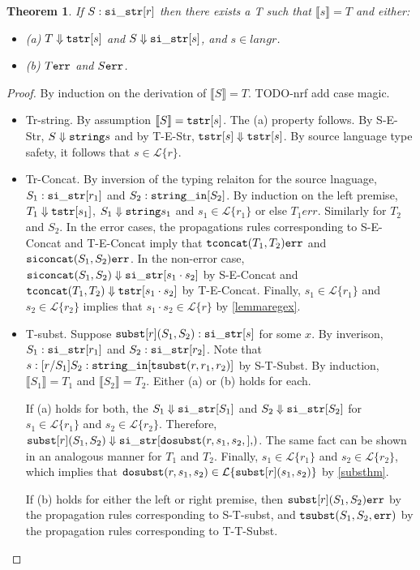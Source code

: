 \documentclass[10pt,preprint]{sigplanconf}
\newtheorem{thm}{Theorem}
\theoremstyle{definition}
\newcommand{\Lagr}{\mathcal{L}}
\newcommand{\lang}[1]{\Lagr\{#1\}}
\newcommand{\sisubst}[3]{{\tt subst}[#1](#2,#3)}
\newcommand{\sistr}[1]{{\tt si\_str}[#1]}
\newcommand{\strin}[1]{\sistr{#1}}
\newcommand{\siconcat}[2]{{\tt siconcat}(#1,#2)}
\newcommand{\stringin}[1]{{\tt string\_in}[#1]}
\newcommand{\tsubst}[3]{{\tt tsubst}(#1,#2,#3)}
\renewcommand{\tstr}[1]{{{\tt tstr}[#1]}}
\newcommand{\tconcat}[2]{{\tt tconcat}(#1,#2)}
\newcommand{\str}{{\tt string}}
\newcommand{\dosubst}[3]{{\tt dosubst}(#1,#2,#3)}
\newcommand{\err}{{\tt err}}
\newcommand{\trden}[1]{\llbracket #1 \rrbracket} %
\newcommand{\treduces}{ \Downarrow }
\newcommand{\sreduces}{ \Downarrow }
\begin{document}
\begin{thm}
If $S : \strin{r}$ then there exists a T such that $\trden{s} = T$ and either: 
\begin{itemize}
\item (a) $T \treduces \tstr{s}$ and $S \sreduces \strin{s}$, and $s \in lang{r}$.
\item (b) $T \err$ and $S \err$.
\end{itemize}
\end{thm}
\begin{proof}
By induction on the derivation of $\trden{S} = T$. TODO-nrf add case magic.
\begin{itemize}
\item Tr-string. By assumption $\trden{S} = \tstr{s}$. The (a) property follows.
By S-E-Str, $S \sreduces \str{s}$ and by T-E-Str, $\tstr{s} \treduces \tstr{s}$.
By source language type safety, it follows that $s \in \lang{r}$.
\item Tr-Concat.
By inversion of the typing relaiton for the source lnaguage, $S_1 : \strin{r_1}$ and $S_2 : \stringin{S_2}$.
By induction on the left premise, $T_1 \treduces \tstr{s_1}$, $S_1 \sreduces \str{s_1}$ and $s_1 \in \lang{r_1}$
or else $T_1 err$. 
Similarly for $T_2$ and $S_2$.
In the error cases, the propagations rules corresponding to S-E-Concat and T-E-Concat imply that $\tconcat{T_1}{T_2} \err$ and $\siconcat{S_1}{S_2} \err$.
In the non-error case, $\siconcat{S_1}{S_2} \sreduces \strin{s_1 \cdot s_2}$ by S-E-Concat and $\tconcat{T_1}{T_2} \treduces \tstr{s_1 \cdot s_2}$ by T-E-Concat.
Finally, $s_1 \in \lang{r_1}$ and $s_2 \in \lang{r_2}$ implies that $s_1 \cdot s_2 \in \lang{r}$ by \ref{lemmaregex}.
\item T-subst.
Suppose $\sisubst{r}{S_1}{S_2} : \strin{s}$ for some $x$. 
By inverison, $S_1 : \strin{r_1}$ and $S_2 : \strin{r_2}$.
Note that $s : \subst{r}{S_1}{S_2} : \stringin{\tsubst{r}{r_1}{r_2}}$ by S-T-Subst.
By induction, $\trden{S_1} = T_1$ and $\trden{S_2} = T_2$.
Either (a) or (b) holds for each.

If (a) holds for both, the $S_1 \sreduces \strin{S_1}$ and $S_2 \sreduces \strin{S_2}$ for $s_1 \in \lang{r_1}$ and $s_2 \in \lang{r_2}$.
Therefore, $\sisubst{r}{S_1}{S_2} \sreduces \strin{\dosubst{r,s_1,s_2}}$.
The same fact can be shown in an analogous manner for $T_1$ and $T_2$.
Finally, $s_1 \in \lang{r_1}$ and $s_2 \in \lang{r_2}$, which implies that $\dosubst{r}{s_1}{s_2} \in \lang{\sisubst{r}{s_1}{s_2}}$ by \ref{substhm}.

If (b) holds for either the left or right premise, then $\sisubst{r}{S_1}{S_2} \err$ by the propagation rules corresponding to S-T-subst, 
and $\tsubst{S_1}{S_2} \err$ by the propagation rules corresponding to T-T-Subst.
\end{itemize}
\end{proof}
\end{document}
